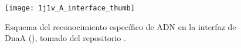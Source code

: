 \begin{figure}
\begin{center} 
\texttt{[image: 1j1v\_A\_interface\_thumb]}
\caption%
{
Esquema del reconocimiento espec\'{i}fico de ADN en la interfaz de DnaA 
(), tomado del repositorio
.
}
\label{fig:dnaA_intf}
\end{center}
\end{figure}

%

